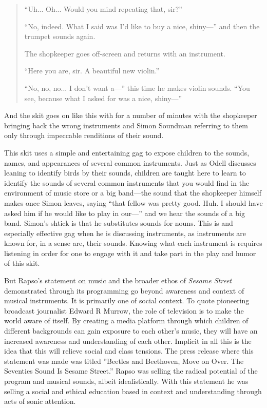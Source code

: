 \documentclass[12pt,letterpaper]{article}
\newcommand{\ses}{\textit{Sesame Street }}
\begin{document}
	\begin{quote}
	\ttfamily
	``Uh... Oh... Would you mind repeating that, sir?''

	``No, indeed. What I said was I'd like to buy a nice, shiny---'' and
	then the trumpet sounds again. 

	The shopkeeper goes off-screen and returns with an instrument. 
	 
	``Here you are, sir. A beautiful new violin.''

	``No, no, no... I don't want a---'' this time he makes violin
	sounds.  ``You see, because what I asked for was a nice, shiny---''
	
	\end{quote}
	
	And the skit goes on like this with for a number of minutes with the 
	shopkeeper bringing back the wrong instruments and Simon Soundman
	referring to them only through impeccable renditions of their sound. 
	
	This skit uses a simple and entertaining gag to expose children to the
	sounds, names, and appearances of several common instruments. Just as 
	Odell
	discusses leaning to identify birds by their sounds, children are	
	taught here to learn to identify the sounds of several common 
	instruments that you would find in the environment of music store or 
	a big band---the sound that the shopkeeper himself makes once Simon
	leaves, saying ``that fellow was pretty good. Huh. I should have asked
	him if he would like to play in our---'' and we hear the sounds of a
	big band. Simon's shtick is that he substitutes sounds for nouns. This
	is and especially effective gag when he is discussing instruments, as
	instruments are known for, in a sense are, their sounds. Knowing what 
	each instrument is requires listening in order for one to engage with 
	it and take part in the play and humor of this skit.  

	But Rapso's statement on music and the broader ethos of \ses 
	demonstrated through its programming go beyond awareness and context of 
	musical instruments. It is primarily one of social context. To quote 
	pioneering broadcast journalist Edward R Murrow,
	the role of television is to make the world aware of
	itself.\autocite[49]{Davis} By creating a media platform through which 
	children of different backgrounds can gain exposure to each other's 
	music, they
	will have an increased awareness and understanding of each other.
	Implicit in all this is the idea that this will relieve social and class
	tensions. The press release where this statement was made was titled 
	''Beetles and Beethoven, Move on Over. The Seventies Sound Is Sesame 
	Street.'' Rapso was selling the radical potential of the program and
	musical sounds, albeit idealistically. With this statement he was 
	selling a social and ethical education based in context and 
	understanding through acts of sonic attention. 
\end{document}
